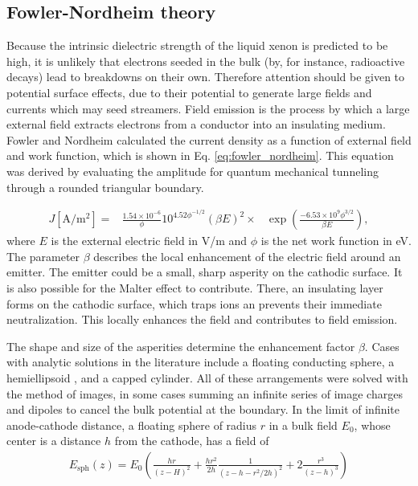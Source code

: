 \subsection{Fowler-Nordheim theory}
Because the intrinsic dielectric strength of the liquid xenon is predicted to be high, it is unlikely that electrons seeded in the bulk (by, for instance, radioactive decays) lead to breakdowns on their own.
Therefore attention should be given to potential surface effects, due to their potential to generate large fields and currents which may seed streamers.
Field emission is the process by which a large external field extracts electrons from a conductor into an insulating medium.
Fowler and Nordheim\cite{noauthor_electron_nodate} calculated the current density as a function of external field and work function, which is shown in Eq. \ref{eq:fowler_nordheim}.
This equation was derived by evaluating the amplitude for quantum mechanical tunneling through a rounded triangular boundary.

\begin{equation}
\begin{aligned}
    J [\text{A}/\text{m}^2] = &\frac{1.54 \times 10^{-6}}{\phi} 10^{4.52 \phi ^{-1/2}} (\beta E)^2 \times  &\exp \left(\frac{-6.53 \times 10^9 \phi ^{3/2}}{\beta E}\right) ,
    \label{eq:fowler_nordheim}
\end{aligned}
\end{equation}
\noindent
where $E$ is the external electric field in V/m and $\phi$ is the net work function in eV.  The parameter $\beta$ describes the local enhancement of the electric field around an emitter.
The emitter could be a small, sharp asperity on the cathodic surface.
It is also possible for the Malter effect\cite{malter_thin_1936} to contribute.
There, an insulating layer forms on the cathodic surface, which traps ions an prevents their immediate neutralization.
This locally enhances the field and contributes to field emission.

The shape and size of the asperities determine the enhancement factor $\beta$.
Cases with analytic solutions in the literature include a floating conducting sphere\cite{pogorelov_corrected_2010}, a hemiellipsoid \cite{pogorelov_enhancement_2009}, and a capped cylinder.
All of these arrangements were solved with the method of images, in some cases summing an infinite series of image charges and dipoles to cancel the bulk potential at the boundary.
In the limit of infinite anode-cathode distance, a floating sphere of radius $r$ in a bulk field $E_0$, whose center is a distance $h$ from the cathode, has a field of
\begin{align}
   E_{\text{sph}}(z) = E_0(\frac{hr}{(z-H)^2} + \frac{hr^2}{2h}\frac{1}{(z-h-r^2/2h)^2} +2 \frac{r^3}{(z-h)^3})
  \end{align}
  
